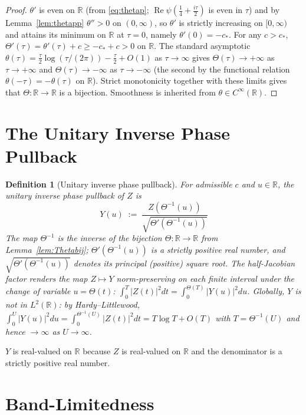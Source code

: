 \documentclass[11pt]{article}
\newtheorem{definition}{Definition}
\DeclareMathOperator{\ReOp}{Re}
\let\Re\ReOp
\begin{document}
\begin{proof}
$\theta'$ is even on $\mathbb{R}$ (from \eqref{eq:thetap}; $\Re\psi(\tfrac{1}{4}+\tfrac{i\tau}{2})$ is even in $\tau$) and by Lemma~\ref{lem:thetapp} $\theta''>0$ on $(0,\infty)$, so $\theta'$ is strictly increasing on $[0,\infty)$ and attains its minimum on $\mathbb{R}$ at $\tau=0$, namely $\theta'(0)=-c_*$. For any $c>c_*$, $\Theta'(\tau)=\theta'(\tau)+c\ge-c_*+c>0$ on $\mathbb{R}$. The standard asymptotic $\theta(\tau)=\tfrac{\tau}{2}\log(\tau/(2\pi))-\tfrac{\tau}{2}+O(1)$ as $\tau\to\infty$ gives $\Theta(\tau)\to+\infty$ as $\tau\to+\infty$ and $\Theta(\tau)\to-\infty$ as $\tau\to-\infty$ (the second by the functional relation $\theta(-\tau)=-\theta(\tau)$ on $\mathbb{R}$). Strict monotonicity together with these limits gives that $\Theta:\mathbb{R}\to\mathbb{R}$ is a bijection. Smoothness is inherited from $\theta\in C^\infty(\mathbb{R})$.
\end{proof}

\section{The Unitary Inverse Phase Pullback}

\begin{definition}[Unitary inverse phase pullback]\label{def:Htilde}
For admissible $c$ and $u\in\mathbb{R}$, the \emph{unitary inverse phase pullback} of $Z$ is
\begin{equation}\label{eq:Ydef}
Y(u) \;:=\; \frac{Z(\Theta^{-1}(u))}{\sqrt{\Theta'(\Theta^{-1}(u))}}
\end{equation}
The map $\Theta^{-1}$ is the inverse of the bijection $\Theta:\mathbb{R}\to\mathbb{R}$ from Lemma~\ref{lem:Thetabij}; $\Theta'(\Theta^{-1}(u))$ is a strictly positive real number, and $\sqrt{\Theta'(\Theta^{-1}(u))}$ denotes its principal (positive) square root. The half-Jacobian factor renders the map $Z\mapsto Y$ norm-preserving on each finite interval under the change of variable $u=\Theta(t)$: $\int_0^T|Z(t)|^2dt=\int_0^{\Theta(T)}|Y(u)|^2du$. Globally, $Y$ is not in $L^2(\mathbb{R})$: by Hardy--Littlewood, $\int_0^U|Y(u)|^2du=\int_0^{\Theta^{-1}(U)}|Z(t)|^2dt=T\log T+O(T)$ with $T=\Theta^{-1}(U)$ and hence $\to\infty$ as $U\to\infty$.
\end{definition}

$Y$ is real-valued on $\mathbb{R}$ because $Z$ is real-valued on $\mathbb{R}$ and the denominator is a strictly positive real number.

\section{Band-Limitedness}
\end{document}
